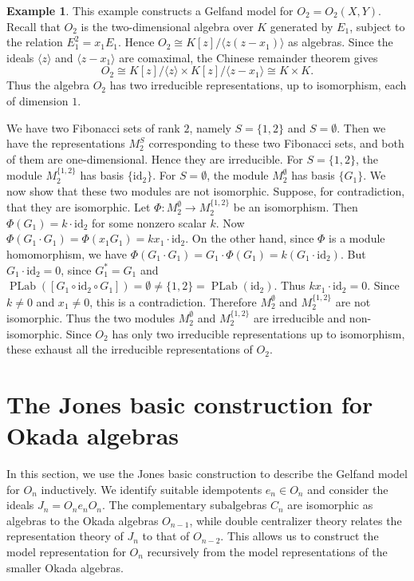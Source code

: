 \documentclass[12pt,reqno]{amsart}
\numberwithin{equation}{section}
\theoremstyle{definition}
\newtheorem{example}[theorem]{Example}
\theoremstyle{definition}
\newcommand{\PLab}{\operatorname{PLab}}
\begin{document}
\begin{example}\label{2 case}
  This example constructs a Gelfand model for $O_2=O_2(X,Y)$. Recall that $O_2$ is
the two-dimensional algebra over $K$ generated by $E_1$, subject
to the relation
$
E_1^2=x_1E_1.$
Hence $
O_2\cong K[z]/\langle z(z-x_1)\rangle$ as algebras.
Since the ideals $\langle z\rangle$ and $\langle z-x_1\rangle$ are
comaximal, the Chinese remainder theorem gives
\[
O_2\cong
K[z]/\langle z\rangle
\times
K[z]/\langle z-x_1\rangle
\cong K\times K.
\]
Thus the algebra $O_2$ has two irreducible representations, up to isomorphism, each of dimension $1$. 


We have two Fibonacci sets of rank $2$, namely $S=\{1,2\}$ and $S=\emptyset$. Then we have the representations $M_2^S$ corresponding to these two Fibonacci sets, and both of them are one-dimensional. Hence they are irreducible.
For $S=\{1,2\}$, the module $M_2^{\{1,2\}}$ has basis $\{\mathrm{id}_2\}$. For $S=\emptyset$, the module $M_2^\emptyset$ has basis $\{G_1\}$.
We now show that these two modules are not isomorphic. Suppose, for contradiction, that they are isomorphic. Let $\Phi:M_2^\emptyset\to M_2^{\{1,2\}}$ be an isomorphism. Then $\Phi(G_1)=k\cdot \mathrm{id}_2$ for some nonzero scalar $k$.
Now $\Phi(G_1\cdot G_1)=\Phi(x_1G_1)=kx_1\cdot \mathrm{id}_2$. On the other hand, since $\Phi$ is a module homomorphism, we have $\Phi(G_1\cdot G_1)=G_1\cdot \Phi(G_1)=k(G_1\cdot \mathrm{id}_2)$. But $G_1\cdot \mathrm{id}_2=0$, since $G_1^*=G_1$ and $\PLab([G_1\circ \mathrm{id}_2\circ G_1])=\emptyset\neq \{1,2\}=\PLab(\mathrm{id}_2)$.
Thus $kx_1\cdot \mathrm{id}_2=0$. Since $k\neq 0$ and $x_1\neq 0$, this is a contradiction. Therefore $M_2^\emptyset$ and $M_2^{\{1,2\}}$ are not isomorphic.
Thus the two modules $M_2^\emptyset$ and $M_2^{\{1,2\}}$ are irreducible and non-isomorphic. Since $O_2$ has only two irreducible representations up to isomorphism,
these exhaust all the irreducible representations of $O_2$.
\end{example}

\section{The Jones basic construction for Okada algebras}
In this section, we use the Jones basic construction to describe the Gelfand model for \(O_n\) inductively. We identify suitable idempotents \(e_n\in O_n\) and consider the ideals
$J_n=O_ne_nO_n.$
The complementary subalgebras \(C_n\) are isomorphic as algebras to the Okada algebras \(O_{n-1}\), while double centralizer theory relates the representation theory of \(J_n\) to that of \(O_{n-2}\). This allows us to construct the model representation for \(O_n\) recursively from the model representations of the smaller Okada algebras.
\end{document}
